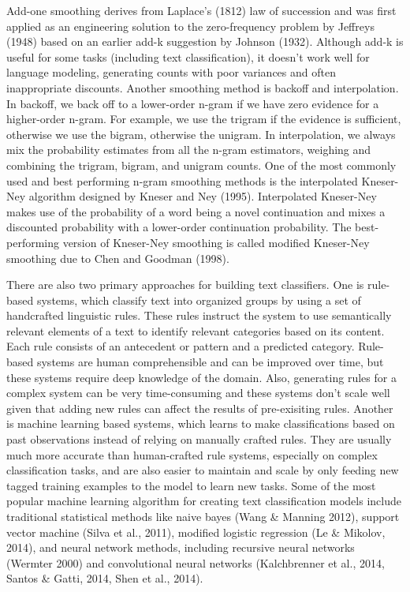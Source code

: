 \documentclass{article}
\begin{document}
Add-one smoothing derives from Laplace's (1812) law of succession and was first applied as an engineering solution to the zero-frequency problem by Jeffreys (1948) based on an earlier add-k suggestion by Johnson (1932). Although add-k is useful for some tasks (including text classification), it doesn't work well for language modeling, generating counts with poor variances and often inappropriate discounts. Another smoothing method is backoff and interpolation. In backoff, we back off to a lower-order n-gram if we have zero evidence for a higher-order n-gram. For example, we use the trigram if the evidence is sufficient, otherwise we use the bigram, otherwise the unigram. In interpolation, we always mix the probability estimates from all the n-gram estimators, weighing and combining the trigram, bigram, and unigram counts. One of the most commonly used and best performing n-gram smoothing methods is the interpolated Kneser-Ney algorithm designed by Kneser and Ney (1995). Interpolated Kneser-Ney makes use of the probability of a word being a novel continuation and mixes a discounted probability with a lower-order continuation probability. The best-performing version of Kneser-Ney smoothing is called modified Kneser-Ney smoothing due to Chen and Goodman (1998).

There are also two primary approaches for building text classifiers. One is rule-based systems, which classify text into organized groups by using a set of handcrafted linguistic rules. These rules instruct the system to use semantically relevant elements of a text to identify relevant categories based on its content. Each rule consists of an antecedent or pattern and a predicted category. Rule-based systems are human comprehensible and can be improved over time, but these systems require deep knowledge of the domain. Also, generating rules for a complex system can be very time-consuming and these systems don't scale well given that adding new rules can affect the results of pre-exisiting rules. Another is machine learning based systems, which learns to make classifications based on past observations instead of relying on manually crafted rules. They are usually much more accurate than human-crafted rule systems, especially on complex classification tasks, and are also easier to maintain and scale by only feeding new tagged training examples to the model to learn new tasks. Some of the most popular machine learning algorithm for creating text classification models include traditional statistical methods like naive bayes (Wang \& Manning 2012), support vector machine (Silva et al., 2011), modified logistic regression (Le \& Mikolov, 2014), and neural network methods, including recursive neural networks (Wermter 2000) and convolutional neural networks (Kalchbrenner et al., 2014, Santos \& Gatti, 2014, Shen et al., 2014).
\end{document}
